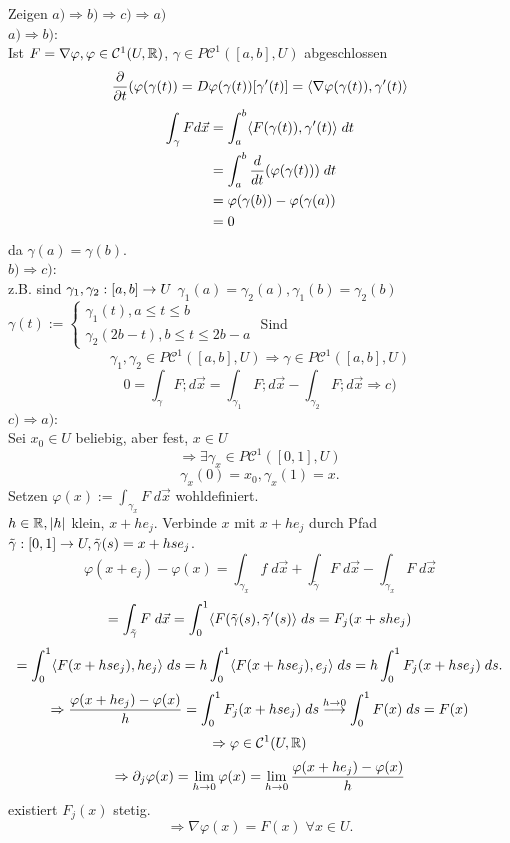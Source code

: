 \documentclass[../ana2.tex]{subfiles}
\begin{document}
\begin{bew}
    Zeigen \(a) \Rightarrow b) \Rightarrow c) \Rightarrow a) \)\\
    \(a) \Rightarrow b) \):\\
    Ist \(F = \nabla \varphi, \varphi \in \mathcal{C}^1(U,\R)\),
    \(\gamma \in P \mathcal{C}^1([a,b], U)\) abgeschlossen
    \[ \ddxpartial{t}(\varphi(\gamma(t)) = D\varphi(\gamma(t))[\gamma'(t)]
    = \scalarprod{\nabla \varphi(\gamma(t))}{\gamma'(t)} \]
    \begin{align*}
        \int_\gamma F d \vec{x} &= \integralx{\scalarprod{F(\gamma(t))}{\gamma'(t)}}{a}{b}{t}\\
        &= \integralx{\ddx{t}(\varphi(\gamma(t)))}{a}{b}{t}\\
        &= \varphi(\gamma(b)) - \varphi(\gamma(a))\\
        &= 0
    \end{align*}
    da \(\gamma(a) = \gamma(b)\).\\    
    \(b) \Rightarrow c) \):\\
    z.B. sind \(\abb{\gamma_1, \gamma_2}{[a,b]}{U} \)
    \(\gamma_1(a) = \gamma_2(a), \gamma_1(b) = \gamma_2(b)\)
    \(\gamma(t) := \begin{cases}
        \gamma_1(t), a \leq t \leq b\\
    \gamma_2(2b - t), b \leq t \leq 2b - a 
    \end{cases} \)    
    Sind \[\gamma_1, \gamma_2 \in P \mathcal{C}^1([a,b], U)
    \Rightarrow \gamma \in P \mathcal{C}^1([a,b], U)\]
    \[0 = \int_\gamma F ; d\vec{x} = \int_{\gamma_1} F ; d\vec{x} - \int_{\gamma_2} F ; d\vec{x} 
    \Rightarrow c)\]    
    \(c) \Rightarrow a)\):\\
     Sei \( x_0 \in U \) beliebig, aber fest, \( x \in U \)
    \[ \Rightarrow \exists \gamma_x \in P \mathcal{C}^1([0,1], U) \]
    \[ \gamma_x(0) = x_0, \gamma_x(1) = x. \]
    Setzen \( \varphi(x) := \int_{\gamma_x} F \; d\vec{x} \) 
    wohldefiniert.\\
    \( h \in \R, \abs{h} \) klein, \( x + h e_j \).
    Verbinde \( x \) mit \( x + h e_j \) durch Pfad \( \abb{\tilde{\gamma}}{[0,1]}{U}, 
    \tilde{\gamma}(s) = x + h s e_j \).
    \[ \varphi(x + e_j) - \varphi(x) 
    = \int_{\gamma_x} f \; d\vec{x} + \int_{\tilde{\gamma}} F \; d\vec{x} - \int_{\gamma_x} F \; d \vec{x} \]
    \[ = \int_{\tilde{\gamma}} F \; d\vec{x} 
    = \integralx{\scalarprod{ F(\tilde{\gamma}(s) }{ \tilde{\gamma}'(s) }}{0}{1}{s} 
    = F_j (x+sh e_j) \]
    \[ = \integralx{\scalarprod{F(x + h s e_j)}{ h e_j }}{0}{1}{s} 
    = h \integralx{ \scalarprod{ F(x + h s e_j) }{ e_j } }{0}{1}{s} 
    = h \integralx{F_j (x + hs e_j)}{0}{1}{s}. \]
    \[ \Rightarrow \frac{ \varphi(x + h e_j) - \varphi(x) }{h} 
    = \integralx{F_j(x+hse_j)}{0}{1}{s}  \overset{h \rightarrow 0}{\longrightarrow} 
    \integralx{F(x)}{0}{1}{s} 
    = F(x) \]
    \[ \Rightarrow \varphi \in \mathcal{C}^1 (U, \R) \]
    \[ \Rightarrow \partial_j \varphi(x) = \limesx{h}{0} \varphi(x) 
    = \limesx{h}{0} \frac{\varphi(x + he_j) - \varphi(x)}{h} \]
    existiert \(F_j(x)\) stetig.
    \[ \Rightarrow \nabla \varphi(x) = F(x) \;\forall x \in U. \]
\end{bew}
\end{document}
